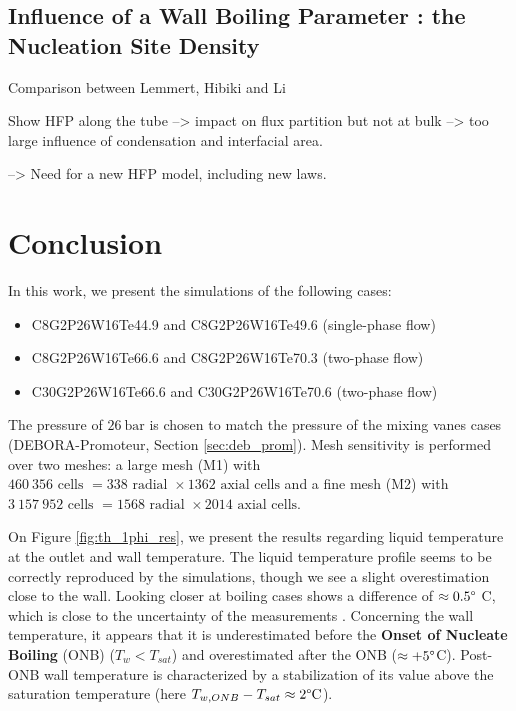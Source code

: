 %


\subsection{Influence of a Wall Boiling Parameter : the Nucleation Site Density}

Comparison between Lemmert, Hibiki and Li

Show HFP along the tube --> impact on flux partition but not at bulk --> too large influence of condensation and interfacial area.

--> Need for a new HFP model, including new laws. 



\section{Conclusion}

\clearpage









In this work, we present the simulations of the following cases:
\begin{itemize}
\item C8G2P26W16Te44.9 and C8G2P26W16Te49.6 (single-phase flow)
\item C8G2P26W16Te66.6 and C8G2P26W16Te70.3 (two-phase flow)
\item C30G2P26W16Te66.6 and C30G2P26W16Te70.6 (two-phase flow)
\end{itemize}

The pressure of $26~\text{bar}$ is chosen to match the pressure of the mixing vanes cases (DEBORA-Promoteur, Section \ref{sec:deb_prom}). Mesh sensitivity is performed over two meshes: a large mesh (M1) with $460~356\text{ cells }=338\text{ radial } \times 1362 \text{ axial cells}$ and a fine mesh (M2) with $3~157~952\text{ cells }=1568\text{ radial } \times 2014 \text{ axial cells}$.

On Figure \ref{fig:th_1phi_res}, we present the results regarding liquid temperature at the outlet and wall temperature. The liquid temperature profile seems to be correctly reproduced by the simulations, though we see a slight overestimation close to the wall. Looking closer at boiling cases shows a difference of $\approx 0.5\degree$ C, which is close to the uncertainty of the measurements \cite{garnier_local_2001}. Concerning the wall temperature, it appears that it is underestimated before the \textbf{Onset of Nucleate Boiling} (ONB) ($T_{w}<T_{sat}$) and overestimated after the ONB ($\approx +5\degree$C). Post-ONB wall temperature is characterized by a stabilization of its value above the saturation temperature (here $T_{w,ONB}-T_{sat}\approx 2\degree\text{C}$).

